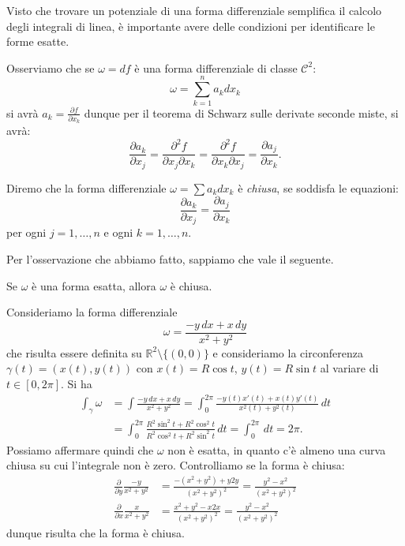\documentclass[italian,a4paper]{scrartcl}
\newcommand{\RR}{{\mathbb R}}
\begin{document}
Visto che trovare un potenziale di una forma differenziale semplifica
il calcolo degli integrali di linea, è importante avere delle
condizioni per identificare le forme esatte.

Osserviamo che se $\omega = df$ è una forma differenziale di classe
$\mathcal C^2$:
\[
 \omega = \sum_{k=1}^n a_k dx_k
\]
si avrà $a_k = \frac{\partial f}{\partial x_k}$ dunque per il teorema
di Schwarz sulle derivate seconde miste, si avrà:
\[
 \frac{\partial a_k}{\partial x_j} = \frac{\partial^2 f}{\partial x_j
   \partial x_k} = \frac{\partial^2 f}{\partial x_k \partial x_j}
=\frac{\partial a_j}{\partial x_k}.
\]

Diremo che la forma differenziale $\omega = \sum a_k dx_k$ è
\emph{chiusa}, se soddisfa le equazioni:
\[
  \frac{\partial a_k}{\partial x_j} = \frac{\partial a_j}{\partial
    x_k}
\]
per ogni $j=1,\dots, n$ e ogni $k=1,\dots,n$.

Per l'osservazione che abbiamo fatto, sappiamo che vale il seguente.
\begin{theorem}
Se $\omega$ è una forma esatta, allora $\omega$ è chiusa.
\end{theorem}

\begin{example}
\label{ex:forma_chiusa_non_esatta}
Consideriamo la forma differenziale
\begin{equation}\label{eq:forma_chiusa_non_esatta}
\omega = \frac{-y\, dx + x\,
  dy}{x^2+y^2}
\end{equation}
che risulta essere definita su $\RR^2 \setminus \{(0,0)\}$ e consideriamo
la circonferenza $\gamma(t)=(x(t),y(t))$ con $x(t) = R \cos t$, $y(t)=R
\sin t$ al variare di $t\in [0,2\pi]$.
Si ha
\begin{align*}
\int_\gamma \omega & = \int \frac{-y\, dx + x\, dy}{x^2+y^2}
=\int_0^{2\pi} \frac{-y(t) x'(t) + x(t) y'(t)}{x^2(t)+y^2(t)}\, dt\\
&=\int_0^{2\pi} \frac{R^2 \sin^2 t + R^2 \cos^2 t}{R^2\cos^2 t +
  R^2\sin^2 t}\, dt = \int_0^{2\pi}\, dt = 2\pi.
\end{align*}
Possiamo affermare quindi che $\omega$ non è esatta, in quanto
c'è almeno una curva chiusa su cui l'integrale non è zero.
Controlliamo se la forma è
chiusa:
\begin{align*}
\frac{\partial}{\partial y}\frac{-y}{x^2+y^2}
& = \frac{-(x^2+y^2)+y2y}{(x^2+y^2)^2}
= \frac{y^2 - x^2}{(x^2+y^2)^2}\\
\frac{\partial}{\partial x}\frac{x}{x^2+y^2}
& = \frac{x^2+y^2-x2x}{(x^2+y^2)^2}
= \frac{y^2 - x^2}{(x^2+y^2)^2}
\end{align*}
dunque risulta che la forma è chiusa.
\end{example}
\end{document}
